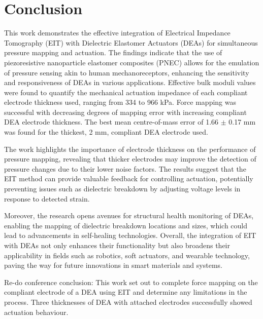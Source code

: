 \section{Conclusion}

This work demonstrates the effective integration of Electrical Impedance Tomography (EIT) with Dielectric Elastomer Actuators (DEAs) for simultaneous pressure mapping and actuation. The findings indicate that the use of piezoresistive nanoparticle elastomer composites (PNEC) allows for the emulation of pressure sensing akin to human mechanoreceptors, enhancing the sensitivity and responsiveness of DEAs in various applications. Effective bulk moduli values were found to quantify the mechanical actuation impedance of each compliant electrode thickness used, ranging from 334 to 966 kPa. Force mapping was successful with decreasing degrees of mapping error with increasing compliant DEA electrode thickness. The best mean centre-of-mass error of 1.66 $\pm$ 0.17 mm was found for the thickest, 2 mm, compliant DEA electrode used.

The work highlights the importance of electrode thickness on the performance of pressure mapping, revealing that thicker electrodes may improve the detection of pressure changes due to their lower noise factors. The results suggest that the EIT method can provide valuable feedback for controlling actuation, potentially preventing issues such as dielectric breakdown by adjusting voltage levels in response to detected strain.

Moreover, the research opens avenues for structural health monitoring of DEAs, enabling the mapping of dielectric breakdown locations and sizes, which could lead to advancements in self-healing technologies. Overall, the integration of EIT with DEAs not only enhances their functionality but also broadens their applicability in fields such as robotics, soft actuators, and wearable technology, paving the way for future innovations in smart materials and systems. 



Re-do conference conclusion: This work set out to complete force mapping on the compliant electrode of a DEA using EIT and determine any limitations in the process. Three thicknesses of DEA with attached electrodes successfully showed actuation behaviour. 


